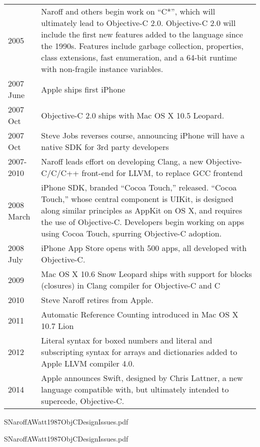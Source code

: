 \documentclass[acmsmall,screen]{acmart}
\begin{document}
\begin{longtable}{lp{4.40in}}
2005	& Naroff and others begin work on ``C*'', which will ultimately lead to Objective-C 2.0. Objective-C 2.0 will include the first new features added to the language since the 1990s. Features include garbage collection, properties, class extensions, fast enumeration, and a 64-bit runtime with non-fragile instance variables. \\
2007 June	& Apple ships first iPhone \\
2007 Oct 	& Objective-C 2.0 ships with Mac OS X 10.5 Leopard. \\
2007 Oct 	& Steve Jobs reverses course, announcing iPhone will have a native SDK for 3rd party developers \\
2007-2010	& Naroff leads effort on developing Clang, a new Objective-C/C/C++ front-end for LLVM, to replace GCC frontend \\
2008 March	& iPhone SDK, branded ``Cocoa Touch,'' released. ``Cocoa Touch,'' whose central component is UIKit, is designed along similar principles as AppKit on OS X, and requires the use of Objective-C. Developers begin working on apps using Cocoa Touch, spurring Objective-C adoption. \\
2008 July	& iPhone App Store opens with 500 apps, all developed with Objective-C. \\
2009	& Mac OS X 10.6 Snow Leopard ships with support for blocks (closures) in Clang compiler for Objective-C and C \\
2010	& Steve Naroff retires from Apple. \\
2011	& Automatic Reference Counting introduced in Mac OS X 10.7 Lion \\
2012	& Literal syntax for boxed numbers and literal and subscripting syntax for arrays and dictionaries added to Apple LLVM compiler 4.0. \\
2014	& Apple announces Swift, designed by Chris Lattner, a new language compatible with, but ultimately intended to supercede, Objective-C. \\

\end{longtable}


{SNaroffAWatt1987ObjCDesignIssues.pdf}

{SNaroffAWatt1987ObjCDesignIssues.pdf}
\end{document}
